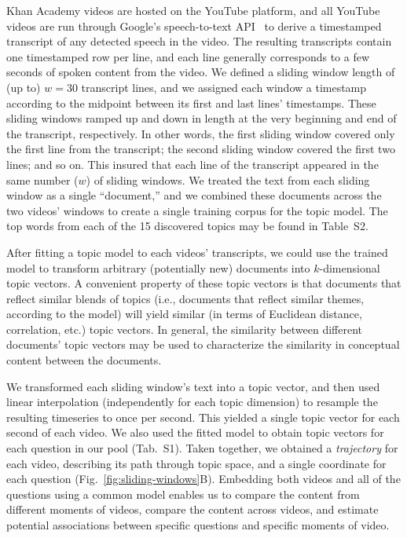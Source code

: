 \documentclass[10pt]{article}
\newcommand{\questions}{S1}
\newcommand{\topics}{S2}
\begin{document}
Khan Academy videos are hosted on the YouTube platform, and all
YouTube videos are run through Google's speech-to-text API~\citep{HalpEtal16}
to derive a timestamped transcript of any detected speech in the video. The
resulting transcripts contain one timestamped row per line, and each line
generally corresponds to a few seconds of spoken content from the video. We
defined a sliding window length of (up to) $w = 30$ transcript lines, and we
assigned each window a timestamp according to the midpoint between its first
and last lines' timestamps. These sliding windows ramped up and down in length
at the very beginning and end of the transcript, respectively. In other words,
the first sliding window covered only the first line from the transcript; the
second sliding window covered the first two lines; and so on. This insured that
each line of the transcript appeared in the same number ($w$) of sliding
windows. We treated the text from each sliding window as a single ``document,''
and we combined these documents across the two videos' windows to create a single
training corpus for the topic model.  The top words from each of the 15 discovered
topics may be found in Table~\topics.

After fitting a topic model to each videos' transcripts, we could use the
trained model to transform arbitrary (potentially new) documents into
$k$-dimensional topic vectors. A convenient property of these topic vectors is
that documents that reflect similar blends of topics (i.e., documents that
reflect similar themes, according to the model) will yield similar (in terms of
Euclidean distance, correlation, etc.) topic vectors. In general, the
similarity between different documents' topic vectors may be used to
characterize the similarity in conceptual content between the documents.

We transformed each sliding window's text into a topic vector, and then used
linear interpolation (independently for each topic dimension) to resample the
resulting timeseries to once per second. This yielded a single topic vector for
each second of each video. We also used the fitted model to obtain topic
vectors for each question in our pool (Tab.~\questions). Taken together, we
obtained a \textit{trajectory} for each video, describing its path through
topic space, and a single coordinate for each question
(Fig.~\ref{fig:sliding-windows}B). Embedding both videos and all of the
questions using a common model enables us to compare the content from different
moments of videos, compare the content across videos, and estimate potential
associations between specific questions and specific moments of video.
\end{document}
